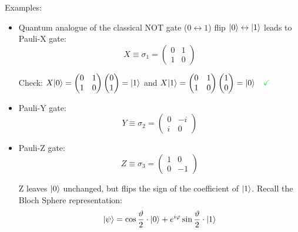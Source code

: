Examples:
\begin{itemize}
    \item Quantum analogue of the classical NOT gate ($0 \leftrightarrow 1$) flip
    $\lvert0\rangle \leftrightarrow \lvert1\rangle$ leads to Pauli-X gate:
    \begin{equation}
        X \equiv \sigma_1 = \begin{pmatrix}
            0 & 1 \\
            1 & 0
        \end{pmatrix}
    \end{equation}

    Check: $X\lvert0\rangle = \begin{pmatrix}
            0 & 1 \\
            1 & 0
        \end{pmatrix} \begin{pmatrix}0 \\ 1 \end{pmatrix} = \lvert1\rangle$ and 
        $X\lvert1\rangle = \begin{pmatrix}
            0 & 1 \\
            1 & 0
        \end{pmatrix} \begin{pmatrix}1 \\ 0 \end{pmatrix} = \lvert0\rangle 
        \quad \color{green}\checkmark $
    
    \item Pauli-Y gate: 
    \begin{equation}
        Y \equiv \sigma_2 = \begin{pmatrix}
            0 & -i \\
            i & 0
        \end{pmatrix}
    \end{equation}

    \item Pauli-Z gate: 
    \begin{equation}
        Z \equiv \sigma_3 = \begin{pmatrix}
            1 & 0 \\
            0 & -1
        \end{pmatrix}
    \end{equation}

    Z leaves $\lvert0\rangle$ unchanged, but flips the sign of the coefficient of $\lvert1\rangle$.
    Recall the Bloch Sphere representation:
    \begin{equation*}
        \lvert\psi\rangle = \cos{\frac{\vartheta}{2}} \cdot \lvert0\rangle + e^{i\varphi} \sin{\frac{\vartheta}{2}} \cdot \lvert1\rangle
    \end{equation*} 


\end{itemize}

